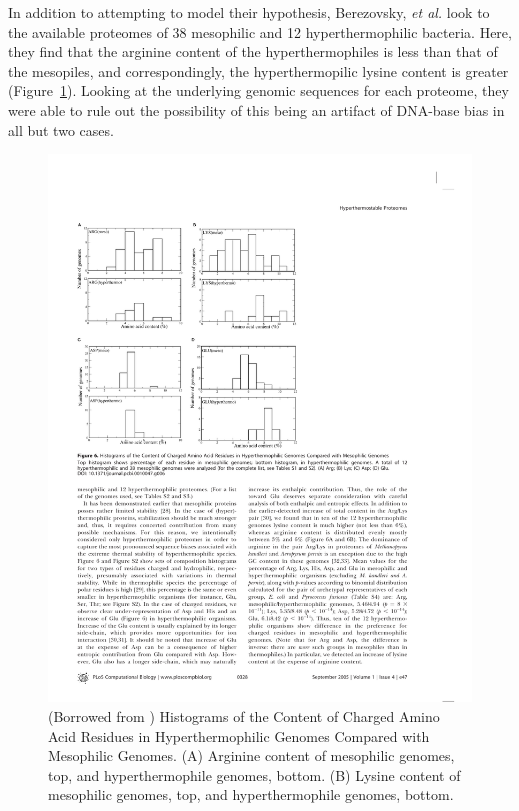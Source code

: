 In addition to attempting to model their hypothesis, Berezovsky, \emph{et al.} look to the available proteomes of 38 mesophilic and 12 hyperthermophilic bacteria. Here, they find that the arginine content of the hyperthermophiles is less than that of the mesopiles, and correspondingly, the hyperthermopilic lysine content is greater (Figure~\ref{fig:aa_content}). Looking at the underlying genomic sequences for each proteome, they were able to rule out the possibility of this being an artifact of DNA-base bias in all but two cases.

\begin{figure}[h]
	\center
	\includegraphics{aa_content}
	\caption{(Borrowed from \cite{Berezovsky:2005p40}) Histograms of the Content of Charged Amino Acid Residues in Hyperthermophilic Genomes Compared with Mesophilic Genomes. (A) Arginine content of mesophilic genomes, top, and hyperthermophile genomes, bottom. (B) Lysine content of mesophilic genomes, top, and hyperthermophile genomes, bottom. }
	\label{fig:aa_content}
\end{figure}

